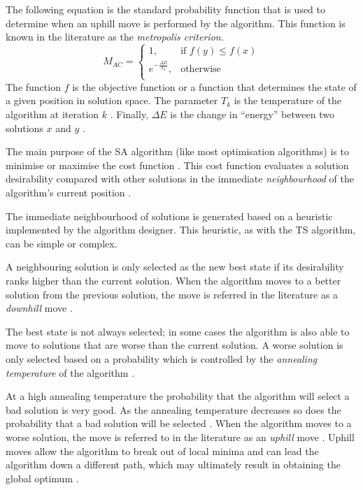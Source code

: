 The following equation is the standard probability function that is used to determine when an uphill move is performed by the algorithm. This function is known in the literature as the \emph{metropolis criterion}. 
\begin{equation}
\label{eq:saprobability}
	M_{AC} =
	\begin{cases}
	1, &\text{if $f(y) \leq f(x)$}\\
	e^{-\frac{\Delta E}{T_k}} , &\text{otherwise}\\
	\end{cases}
\end{equation}
The function $f$ is the objective function or a function that determines the state of a given position in solution space\cite{EcoEquilSA}. The parameter $T_k$ is the temperature of the algorithm at iteration $k$ \cite{EcoEquilSA}. Finally, $\Delta E$ is the change in ``energy'' between two solutions $x$ and $y$ \cite{EcoEquilSA}.

The main purpose of the \gls{SA} algorithm (like most optimisation algorithms) is to minimise or maximise the cost function \cite{SASingleMultiObj}. This cost function evaluates a solution desirability compared with other solutions in the immediate \emph{neighbourhood} of the algorithm's current position \cite{TheoPraticalSA}. 

The immediate neighbourhood of solutions is generated based on a heuristic implemented by the algorithm designer\cite{AIModernApproach}. This heuristic, as with the \gls{TS} algorithm, can be simple or complex.

A neighbouring solution is only selected as the new best state if its desirability ranks higher than the current solution. When the algorithm moves to a better solution from the previous solution, the move is referred in the literature as a \emph{downhill} move \cite{CurveFittingSA}.

The best state is not always selected; in some cases the algorithm is also able to move to solutions that are worse than the current solution. A worse solution is only selected based on a probability which is controlled by the \emph{annealing temperature} of the algorithm \cite{TheoPraticalSA}. 

At a high annealing temperature the probability that the algorithm will select a bad solution is very good. As the annealing temperature decreases so does the probability that a bad solution will be selected \cite{CurveFittingSA}. When the algorithm moves to a worse solution, the move is referred to in the literature as an \emph{uphill} move \cite{CurveFittingSA}. Uphill moves allow the algorithm to break out of local minima and can lead the algorithm down a different path, which may ultimately result in obtaining the global optimum \cite{SASingleMultiObj}. 

